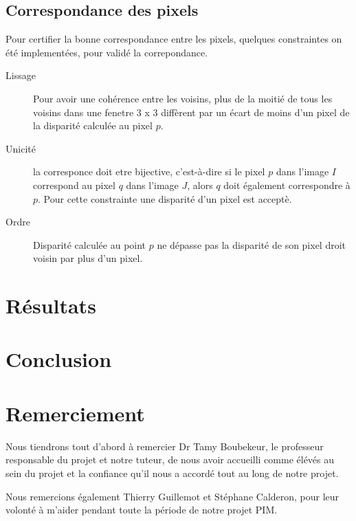 \documentclass[a4paper,11pt]{article}
\begin{document}
\subsection{Correspondance des pixels}

Pour certifier la bonne correspondance entre les pixels, quelques constraintes on été implementées, pour validé la correpondance.
\begin{description}

\item[Lissage] Pour avoir une cohérence entre les voisins, plus de la moitié de tous les voisins dans une fenetre 3 x 3 diffèrent par un écart de moins d'un pixel de la disparité calculée au pixel $p$.  

\item[Unicité] la corresponce doit etre bijective, c'est-à-dire si le pixel $p$ dans l'image $I$ correspond au pixel $q$ dans l'image $J$, alors $q$ doit également correspondre à $p$. Pour cette constrainte une disparité d'un pixel est acceptè.
\item[Ordre] Disparité calculée au point $p$ ne dépasse pas la disparité de son pixel droit voisin par plus d'un pixel.


\end{description}

\section{Résultats}

\section{Conclusion}

\section{Remerciement}
Nous tiendrons tout d’abord à remercier Dr Tamy Boubekeur, le professeur responsable du projet et notre tuteur, de nous avoir accueilli comme élévés au sein du projet et la confiance qu’il nous a accordé tout au long de notre projet.

Nous remercions également Thierry Guillemot et Stéphane Calderon, pour leur volonté à m’aider pendant toute la période de notre projet PIM.

\nocite{Beeler:2010:HSC:1778765.1778777}
\nocite{Beeler:2011:HPF:2010324.1964970}

\begin{small}
  
\end{small}
\section*{}
\end{document}
